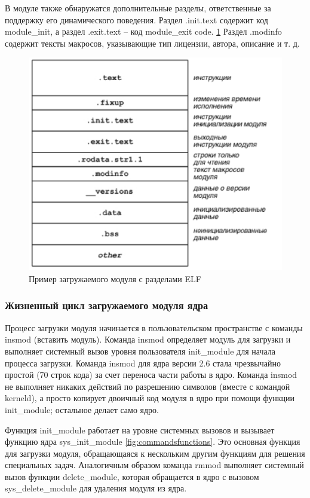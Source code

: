В модуле также обнаружатся дополнительные разделы, ответственные за поддержку его динамического поведения. 
Раздел .init.text содержит код module\_init, а раздел .exit.text – код module\_exit code. \ref{fig:coreelf}
Раздел .modinfo содержит тексты макросов, указывающие тип лицензии, автора, описание и т. д.

\begin{figure}[H]
	\centering
	\includegraphics[width=0.7\linewidth]{src/img/core_elf}
	\caption{Пример загружаемого модуля с разделами ELF}
	\label{fig:coreelf}
\end{figure}

\subsubsection{Жизненный цикл загружаемого модуля ядра}
Процесс загрузки модуля начинается в пользовательском пространстве с команды insmod (вставить модуль). 
Команда insmod определяет модуль для загрузки и выполняет системный вызов уровня пользователя init\_module для начала процесса загрузки. 
Команда insmod для ядра версии 2.6 стала чрезвычайно простой (70 строк кода) за счет переноса части работы в ядро. 
Команда insmod не выполняет никаких действий по разрешению символов (вместе с командой kerneld), а просто копирует двоичный код модуля в ядро при помощи функции init\_module; остальное делает само ядро.

Функция init\_module работает на уровне системных вызовов и вызывает функцию ядра sys\_init\_module \ref{fig:commandsfunctions}. Это основная функция для загрузки модуля, обращающаяся к нескольким другим функциям для решения специальных задач. Аналогичным образом команда rmmod выполняет системный вызов функции delete\_module, которая обращается в ядро с вызовом sys\_delete\_module для удаления модуля из ядра.

